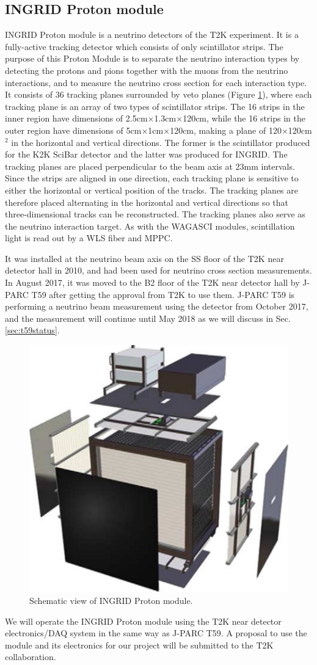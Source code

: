 \subsection{INGRID Proton module}
INGRID Proton module is a neutrino detectors of the T2K experiment.
It is a fully-active tracking detector which consists of only scintillator strips. 
The purpose of this Proton Module is to separate the neutrino interaction types by detecting the protons and pions together with the muons from the neutrino interactions, and to measure the neutrino cross section for each interaction type.
It consists of 36 tracking planes surrounded by veto planes (Figure \ref{fig:proton_module}), where each tracking plane is an array of two types of scintillator strips. 
The 16 strips in the inner region have dimensions of 2.5cm$\times$1.3cm$\times$120cm, while the 16 strips in the outer region have dimensions of 5cm$\times$1cm$\times$120cm, making a plane of 120$\times$120cm$^{2}$ in the horizontal and vertical directions.
The former is the scintillator produced for the K2K SciBar detector \cite{scibar} and the latter was produced for INGRID.
The tracking planes are placed perpendicular to the beam axis at 23mm intervals.
Since the strips are aligned in one direction, each tracking plane is sensitive to either the horizontal or vertical position of the tracks.
The tracking planes are therefore placed alternating in the horizontal and vertical directions so that three-dimensional tracks can be reconstructed.
The tracking planes also serve as the neutrino interaction target.
As with the WAGASCI modules, scintillation light is read out by a WLS fiber and MPPC.


It was installed at the neutrino beam axis on the SS floor of the T2K near detector hall in 2010, and had been used for neutrino cross section measurements.
In August 2017, it was moved to the B2 floor of the T2K near detector hall by J-PARC T59 after getting the approval from T2K to use them.
J-PARC T59 is performing a  neutrino beam measurement using the detector from October 2017, and the measurement  will continue until May 2018 as we will discuss in Sec. \ref{sec:t59status}.

\begin{figure}[tbh]
\begin{center}
\includegraphics[width=0.5\linewidth]{fig/proton_module.pdf}
\end{center}
\caption{
Schematic view of INGRID Proton module.
}
\label{fig:proton_module}
\end{figure}


We will operate the INGRID Proton module using the T2K near detector electronics/DAQ system in the same way as J-PARC T59.
A proposal to use the module and its electronics for our project will be submitted to the T2K collaboration.

